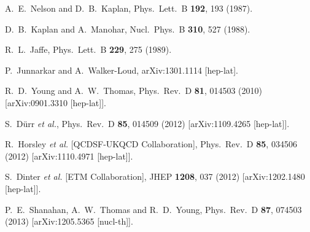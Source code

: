 \begin{thebibliography}{99}
  A.~E.~Nelson and D.~B.~Kaplan,
  Phys.\ Lett.\ B {\bf 192}, 193 (1987).

  D.~B.~Kaplan and A.~Manohar,
  Nucl.\ Phys.\ B {\bf 310}, 527 (1988).

  R.~L.~Jaffe,
  Phys.\ Lett.\ B {\bf 229}, 275 (1989).
  
  P.~Junnarkar and A.~Walker-Loud,
  arXiv:1301.1114 [hep-lat].

  R.~D.~Young and A.~W.~Thomas,
  Phys.\ Rev.\ D {\bf 81}, 014503 (2010)
  [arXiv:0901.3310 [hep-lat]].

  S.~D{\"u}rr {\it et al.},
  Phys.\ Rev.\ D {\bf 85}, 014509 (2012)
  [arXiv:1109.4265 [hep-lat]].

  R.~Horsley {\it et al.}  [QCDSF-UKQCD Collaboration],
  Phys.\ Rev.\ D {\bf 85}, 034506 (2012)
  [arXiv:1110.4971 [hep-lat]].

  S.~Dinter {\it et al.}  [ETM Collaboration],
  JHEP {\bf 1208}, 037 (2012)
  [arXiv:1202.1480 [hep-lat]].

  P.~E.~Shanahan, A.~W.~Thomas and R.~D.~Young,
  Phys.\ Rev.\ D {\bf 87}, 074503 (2013)
  [arXiv:1205.5365 [nucl-th]].


\end{thebibliography}
